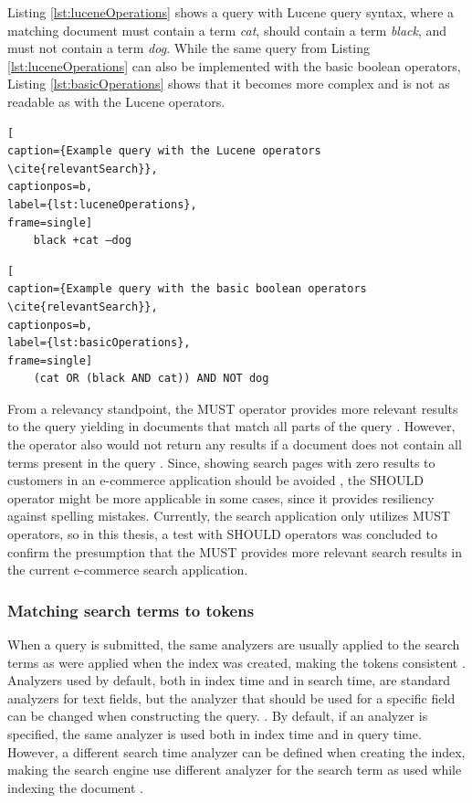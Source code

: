 Listing \ref{lst:luceneOperations} shows a query with Lucene query syntax, where a matching document must contain a term \emph{cat},
should contain a term \emph{black}, and must not contain a term \emph{dog}.
While the same query from Listing \ref{lst:luceneOperations} can also be implemented with the basic boolean operators,
Listing \ref{lst:basicOperations} shows that it becomes more complex and is not as readable as with the Lucene operators.
\cite{relevantSearch}
\begin{lstlisting}[
caption={Example query with the Lucene operators \cite{relevantSearch}},
captionpos=b,
label={lst:luceneOperations},
frame=single]
    black +cat –dog
\end{lstlisting}
\begin{lstlisting}[
caption={Example query with the basic boolean operators \cite{relevantSearch}},
captionpos=b,
label={lst:basicOperations},
frame=single]
    (cat OR (black AND cat)) AND NOT dog
\end{lstlisting}


From a relevancy standpoint, the MUST operator provides more relevant results to the query 
yielding in documents that match all parts of the query \cite{relevantSearch}.
However, the operator also would not return any results if a document does not contain all terms present in the query \cite{relevantSearch}.
Since, showing search pages with zero results to customers in an e-commerce application should be avoided \cite{zeroResults},
the SHOULD operator might be more applicable in some cases, since it provides resiliency against spelling mistakes.
Currently, the search application only utilizes MUST operators, so in this thesis, a test with SHOULD operators was concluded
to confirm the presumption that the MUST provides more relevant search results in the current e-commerce search application.



\subsubsection{Matching search terms to tokens}

When a query is submitted, the same analyzers are usually applied to the search terms as were applied 
when the index was created, making the tokens consistent
\cite{relevantSearch}.
Analyzers used by default, both in index time and in search time, are standard analyzers for text fields,
but the analyzer that should be used for a specific field can be changed when constructing the query.
\cite{elasticIntro}.
By default, if an analyzer is specified, the same analyzer is used both in index time and in query time.
However, a different search time analyzer can be defined when creating the index, making the search engine
use different analyzer for the search term as used while indexing the document \cite{relevantSearch}.


